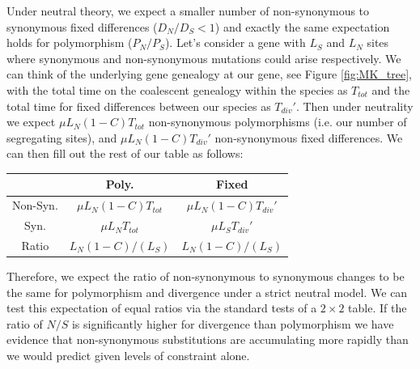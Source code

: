 Under neutral theory, we expect a smaller number of non-synonymous to
synonymous fixed differences ($D_N/D_S < 1$) and exactly the same
expectation holds for polymorphism ($P_N/P_S$). Let's consider a gene with $L_S$ and $L_N$ sites where synonymous and non-synonymous mutations could arise respectively. 
We can think of the underlying gene genealogy at our gene, see Figure \ref{fig:MK_tree}, with the total time on the coalescent genealogy within the species as $T_{tot}$ and the total time for fixed differences between our species as $T_{div}'$. Then under neutrality we expect $ \mu L_N (1-C) T_{tot}$
non-synonymous polymorphisms (i.e. our number of segregating sites), and  $ \mu L_N (1-C) T_{div}'$ non-synonymous fixed differences. We can then fill out the rest of our table as follows: 


\begin{center}
\begin{tabular}{ccc}
 & Poly. & Fixed  \\
 \hline
Non-Syn. &    $\mu L_N (1-C) T_{tot}$  &   $\mu L_N (1-C)  T_{div}'$ \\
Syn. &    $\mu L_N T_{tot}$   &     $\mu L_S T_{div}'$  \\
Ratio & $ L_N(1-C)/( L_S)$  & $ L_N (1-C) / ( L_S)$
\end{tabular}
\end{center}
Therefore, we expect the ratio of non-synonymous to synonymous changes to be the same for polymorphism and divergence under a strict neutral model. We can test this expectation of equal ratios via the standard tests of a $2
\times 2$ table. If the ratio of $N/S$ is significantly higher for divergence than polymorphism we have evidence that non-synonymous substitutions are accumulating more rapidly than we would predict given levels of constraint alone.

